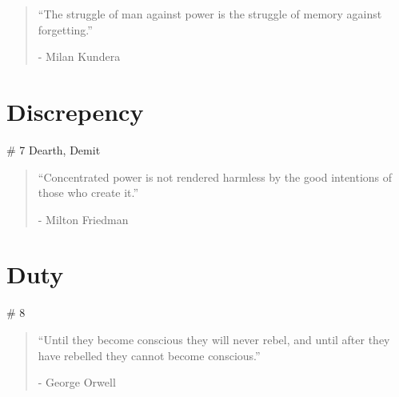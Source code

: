 \vspace{-1.3cm}
\begin{localsize}{10}
	\begin{quote}
		“The struggle of man against power is the struggle of memory against forgetting.”
		\begin{flushright}- Milan Kundera \end{flushright}
	\end{quote} 
\end{localsize}
\vspace{1cm}

\chapter{Discrepency} # 7 Dearth, Demit

\vspace{-1.3cm}
\begin{localsize}{10}
	\begin{quote}
	“Concentrated power is not rendered harmless by the good intentions of those who create it.” 
		\begin{flushright}- Milton Friedman \end{flushright}	
	\end{quote} 
\end{localsize}
\vspace{1cm}

\chapter{Duty} # 8

\vspace{-1.3cm}
\begin{localsize}{10}
	\begin{quote}
		“Until they become conscious they will never rebel, and until after they have rebelled they cannot become conscious.”
		\begin{flushright}- George Orwell \end{flushright}
	\end{quote} 
\end{localsize}
\vspace{1cm}

